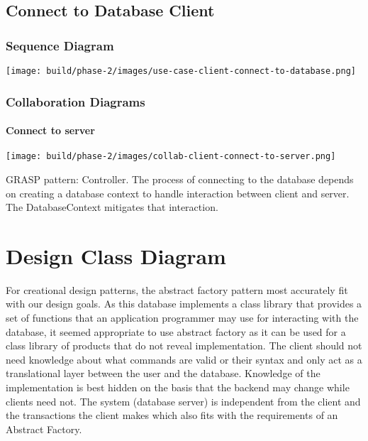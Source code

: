 \documentclass[a4paper]{report}
\begin{document}
\section{Connect to Database Client}

	\subsection{Sequence Diagram}

		\begin{center}
			\texttt{[image: build/phase-2/images/use-case-client-connect-to-database.png]}
		\end{center}

	\subsection{Collaboration Diagrams}

		\subsubsection{Connect to server}

			\begin{center}
				\texttt{[image: build/phase-2/images/collab-client-connect-to-server.png]}
			\end{center}

			GRASP pattern: Controller. The process of connecting to the database depends on creating a database context to handle interaction between client and server. The DatabaseContext mitigates that interaction.

\chapter{Design Class Diagram}

	For creational design patterns, the abstract factory pattern most accurately fit with our design goals. As this database implements a class library that provides a set of functions that an application programmer may use for interacting with the database, it seemed appropriate to use abstract factory as it can be used for a class library of products that do not reveal implementation. The client should not need knowledge about what commands are valid or their syntax and only act as a translational layer between the user and the database. Knowledge of the implementation is best hidden on the basis that the backend may change while clients need not. The system (database server) is independent from the client and the transactions the client makes which also fits with the requirements of an Abstract Factory.
\end{document}
